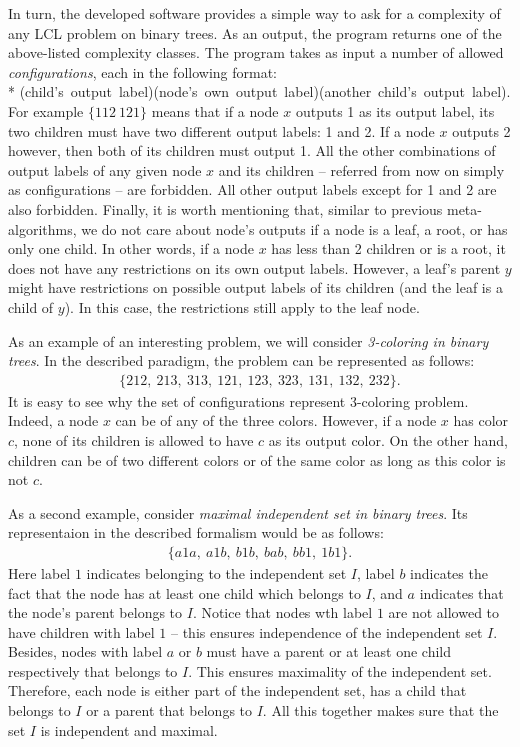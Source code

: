 In turn, the developed software provides a simple way to ask for a complexity
of any LCL problem on binary trees. As an output, the program returns
one of the above-listed complexity classes. The program takes as input a
number of allowed \emph{configurations}, each in the following format:\\*
\mbox{(child's~output~label)(node's~own~output~label)(another~child's~output~label)}.
For example $\{112~121\}$ means that if a node $x$ outputs 1 as its output label,
its two children must have two different output labels: 1 and 2. If
a node $x$ outputs 2 however, then both of its children must output 1.
All the other combinations of output labels of any given node $x$ and
its children -- referred from now on simply as configurations --
are forbidden. All other output labels except for 1 and 2 are also
forbidden. Finally, it is worth mentioning that, similar to previous
meta-algorithms, we do not care about node's outputs if a node is a leaf,
a root, or has only one child. In other words, if a node $x$ has less than
2 children or is a root, it
does not have any restrictions on its own output labels. However, a leaf's parent $y$ might have restrictions on possible output labels of its children
(and the leaf is a child of $y$). In this case, the restrictions still
apply to the leaf node.

As an example of an interesting problem, we will consider
\emph{3-coloring in binary trees}. In the described paradigm,
the problem can be represented as follows:
\begin{align*}
  \{212,~213,~313,~121,~123,~323,~131,~132,~232\}.
\end{align*}
It is easy to see why the set of configurations represent
3-coloring problem. Indeed, a node $x$ can be of any of the three
colors. However, if a node $x$ has color $c$, none of its
children is allowed to have $c$ as its output color. On the
other hand, children can be of two different colors or of the same
color as long as this color is not $c$.

As a second example, consider \emph{maximal independent set in
binary trees}. Its representaion in the described formalism would be
as follows:
\begin{align*}
  \{a1a,~a1b,~b1b,~bab,~bb1,~1b1\}.
\end{align*}
Here label $1$ indicates belonging to the independent set $I$, label $b$
indicates the fact that the node has at least one child which belongs to
$I$, and $a$ indicates that the node's parent belongs to $I$.
Notice that nodes wth label $1$ are not allowed to have children with
label $1$ -- this ensures independence of the independent set $I$.
Besides, nodes with label $a$ or $b$ must have a parent or at least one
child respectively that belongs to $I$. This ensures maximality of the
independent set.
Therefore,
each node is either part of the independent set, has a child that belongs
to $I$ or a parent that belongs to $I$. All this together makes sure
that the set $I$ is independent and maximal.


